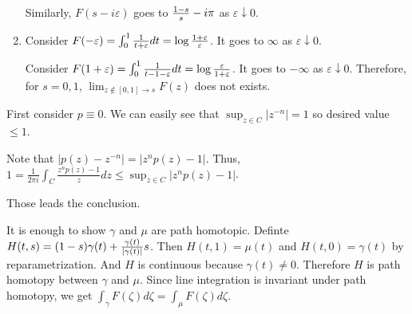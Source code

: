 \begin{problem}[2.3]
\begin{enumerate}[label = (\alph*)]
			Similarly, $F(s-i\varepsilon)$ goes to ${1-s \over s} -i\pi$ as $\varepsilon \downarrow 0$.

		\item Consider $F(-\varepsilon) = \int_0^1 {1 \over t+\varepsilon} dt = \log {1 + \varepsilon \over \varepsilon}$. It goes to $\infty$ as $\varepsilon \downarrow 0$. 

			Consider $F(1+\varepsilon) = \int_0^1 {1 \over t - 1 - \varepsilon}dt = \log{\varepsilon \over 1+ \varepsilon}$. It goes to $-\infty$ as $\varepsilon \downarrow 0$. Therefore, for $s = 0, 1$, $\lim_{z \notin \left[ 0, 1 \right] \rightarrow s} F(z)$ does not exists.
	\end{enumerate}
	
\end{problem}

\begin{problem}[2.4] \hfill

	First consider $p\equiv0$. We can easily see that $\sup_{z \in C} |z^{-n}| = 1$ so desired value $\leq 1$.

	Note that $|p(z) - z^{-n}| = |z^n p(z) - 1|$. Thus, $1 = \frac{1}{2\pi i} \int_C \frac{z^n p(z) -1}{z}dz \leq \sup_{z\in C}|z^np(z) -1|$. 

	Those leads the conclusion.
	
\end{problem}

\begin{problem}[2.5] \hfill

	It is enough to show $\gamma$ and $\mu$ are path homotopic. Definte $H(t, s) = (1-s)\gamma(t) + {\gamma(t) \over |\gamma(t)|}s$. Then $H(t, 1) = \mu(t)$ and $H(t, 0) = \gamma(t)$ by reparametrization. And $H$ is continuous because $\gamma(t) \ne 0$. Therefore $H$ is path homotopy between $\gamma$ and $\mu$. Since line integration is invariant under path homotopy, we get $\int_\gamma F(\zeta) d\zeta = \int_\mu F(\zeta) d\zeta$.
	
\end{problem}
